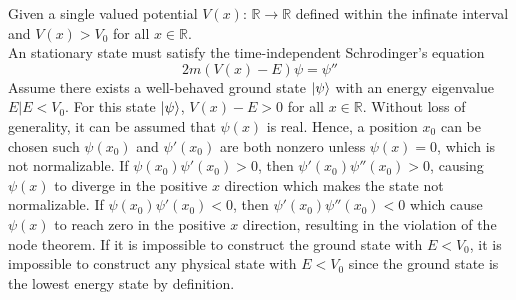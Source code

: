 \begin{sol}
	Given a single valued potential $V(x)$: $\mathbb{R}\to\mathbb{R}$ defined within the infinate interval and $V(x)>V_0$ for all $x \in\mathbb{R}$. \\
	An stationary state must satisfy the time-independent Schrodinger's equation
	\begin{equation}
		2m(V(x)-E)\psi=\psi''
	\end{equation}
	Assume there exists a well-behaved ground state $\ket\psi$ with an energy eigenvalue $E|E<V_0$. For this state $\ket\psi$, $V(x)-E>0$ for all $x \in\mathbb{R}$. Without loss of generality, it can be assumed that $\psi(x)$ is real. Hence, a position $x_0$ can be chosen such $\psi(x_0)$ and $\psi'(x_0)$ are both nonzero unless $\psi(x)=0$, which is not normalizable. If $\psi(x_0)\psi'(x_0)>0$, then $\psi'(x_0)\psi''(x_0)>0$, causing $\psi(x)$ to diverge in the positive $x$ direction which makes the state not normalizable. If $\psi(x_0)\psi'(x_0)<0$, then $\psi'(x_0)\psi''(x_0)<0$ which cause $\psi(x)$ to reach zero in the positive $x$ direction, resulting in the violation of the node theorem. If it is impossible to construct the ground state with $E<V_0$, it is impossible to construct any physical state with $E<V_0$ since the ground state is the lowest energy state by definition. 
\end{sol}